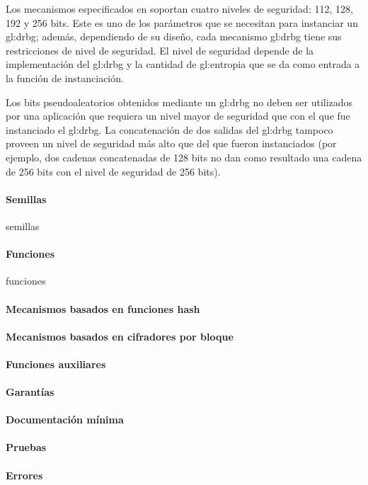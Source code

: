 Los mecanismos especificados en \cite{nist_aleatorios} soportan cuatro niveles
de seguridad: 112, 128, 192 y 256 bits. Este es uno de los parámetros que
se necesitan para instanciar un \gls{gl:drbg}; además, dependiendo de su diseño,
cada mecanismo  \gls{gl:drbg} tiene sus restricciones de nivel de seguridad.
El nivel de seguridad depende de la implementación del \gls{gl:drbg} y la
cantidad de \gls{gl:entropia} que se da como entrada a la función de
instanciación.

Los bits pseudoaleatorios obtenidos mediante un \gls{gl:drbg} no deben ser
utilizados por una aplicación que requiera un nivel mayor de seguridad que con
el que fue instanciado el \gls{gl:drbg}. La concatenación de dos salidas del
\gls{gl:drbg} tampoco proveen un nivel de seguridad más alto que del que fueron
instanciados (por ejemplo, dos cadenas concatenadas de 128 bits no dan como
resultado una cadena de 256 bits con el nivel de seguridad de 256 bits).

\paragraph{Semillas}
{semillas}

\paragraph{Funciones}
{funciones}

\paragraph{Mecanismos basados en funciones hash}

\paragraph{Mecanismos basados en cifradores por bloque}

\paragraph{Funciones auxiliares}

\paragraph{Garantías}

\paragraph{Documentación mínima}

\paragraph{Pruebas}

\paragraph{Errores}
